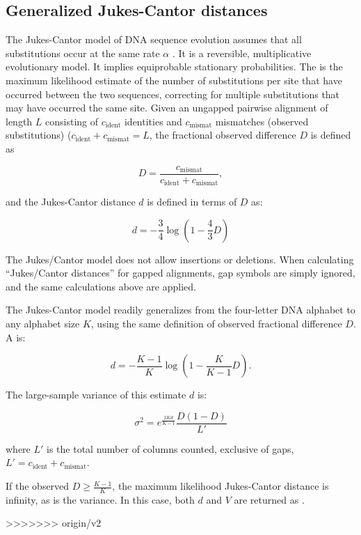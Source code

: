 \subsection{Generalized Jukes-Cantor distances}

The Jukes-Cantor model of DNA sequence evolution assumes that all
substitutions occur at the same rate $\alpha$
\citep{JukesCantor69}. It is a reversible, multiplicative evolutionary
model. It implies equiprobable stationary probabilities. The
 is the maximum likelihood estimate of
the number of substitutions per site that have occurred between the
two sequences, correcting for multiple substitutions that may have
occurred the same site. Given an ungapped pairwise alignment of length
$L$ consisting of $c_{\mbox{ident}}$ identities and
$c_{\mbox{mismat}}$ mismatches (observed substitutions)
($c_{\mbox{ident}} + c_{\mbox{mismat}} = L$, the fractional observed
difference $D$ is defined as

\[
  D = \frac{c_{\mbox{mismat}}}{c_{\mbox{ident}} + c_{\mbox{mismat}}},
\]

and the Jukes-Cantor distance $d$ is defined in terms of $D$ as:

\[
  d = -\frac{3}{4} \log \left( 1 - \frac{4}{3} D \right)
\]

The Jukes/Cantor model does not allow insertions or deletions.  When
calculating ``Jukes/Cantor distances'' for gapped alignments, gap
symbols are simply ignored, and the same calculations above are
applied.

The Jukes-Cantor model readily generalizes from the four-letter DNA
alphabet to any alphabet size $K$, using the same definition of
observed fractional difference $D$. A  is:

\[
  d = -\frac{K-1}{K} \log \left( 1 - \frac{K}{K-1} D \right).
\]

The large-sample variance of this estimate $d$ is:

\[
   \sigma^2 = e^\frac{2Kd}{K-1} \frac{D(1-D)}{L'}
\]

where $L'$ is the total number of columns counted, exclusive of gaps,
$L' = c_{\mbox{ident}} + c_{\mbox{mismat}}$.

If the observed $D \geq \frac{K-1}{K}$, the maximum likelihood
Jukes-Cantor distance is infinity, as is the variance. In this case,
both $d$ and $V$ are returned as . 


>>>>>>> origin/v2
